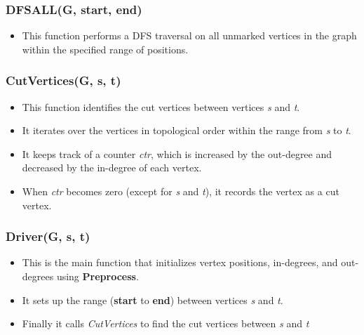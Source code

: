 \documentclass{article}
\begin{document}
\subsubsection{DFSALL(G, start, end)}
\begin{itemize}
    \item This function performs a DFS traversal on all unmarked vertices in the graph within the specified range of positions.
\end{itemize}

\subsubsection{CutVertices(G, s, t)}
\begin{itemize}
    \item This function identifies the cut vertices between vertices \textit{s} and \textit{t}.
    \item It iterates over the vertices in topological order within the range from \textit{s} to \textit{t}.
    \item It keeps track of a counter \textit{ctr}, which is increased by the out-degree and decreased by the in-degree of each vertex.
    \item When \textit{ctr} becomes zero (except for \textit{s} and \textit{t}), it records the vertex as a cut vertex.
\end{itemize}

\subsubsection{Driver(G, s, t)}
\begin{itemize}
    \item This is the main function that initializes vertex positions, in-degrees, and out-degrees using \textbf{Preprocess}.
    \item It sets up the range (\textbf{start} to \textbf{end}) between vertices \textit{s} and \textit{t}.
    \item Finally it calls \textit{CutVertices} to find the cut vertices between \textit{s} and \textit{t}
\end{itemize}
\end{document}
